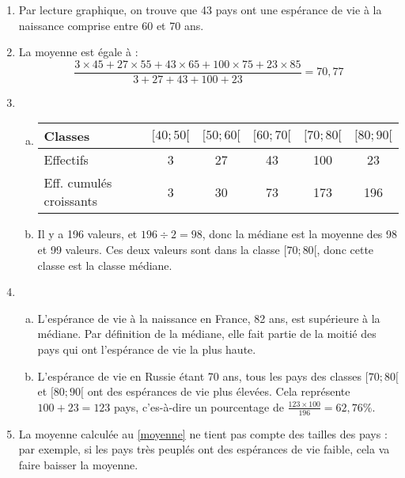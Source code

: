 \documentclass[12pt]{article}
\begin{document}
\begin{exercice}
  \begin{enumerate}[(1)]
    \item Par lecture graphique, on trouve que 43 pays ont une espérance de vie à la naissance comprise entre 60 et 70 ans.
    \item\label{moyenne} La moyenne est égale à :
      \[\frac{3\times45+27\times55+43\times65+100\times75+23\times85}{3+27+43+100+23}=70,77\]
    \item
      \begin{enumerate}[(a)]
        \item 
          \begin{tabular}{l|ccccc}
            Classes & $[40;50[$ & $[50;60[$ & $[60;70[$ & $[70;80[$ & $[80;90[$ \\
            \hline
            Effectifs & 3 & 27 & 43 & 100 & 23 \\
            \hline
            Eff. cumulés croissants & 3 & 30 & 73 & 173 & 196 \\
          \end{tabular}
        \item Il y a 196 valeurs, et $196\div2=98$, donc la médiane est la
          moyenne des 98 et 99 valeurs. Ces deux valeurs sont dans la
          classe $[70;80[$, donc cette classe est la classe médiane.
      \end{enumerate}
    \item
      \begin{enumerate}[(a)]
      \item L'espérance de vie à la naissance en France, 82 ans, est supérieure à la médiane. Par définition de la médiane, elle fait partie de la moitié des pays qui ont l'espérance de vie la plus haute.
      \item L'espérance de vie en Russie étant 70 ans, tous les pays des classes $[70;80[$ et $[80;90[$ ont des espérances de vie plus élevées. Cela représente $100+23=123$ pays, c'es-à-dire un pourcentage de $\frac{123\times100}{196}=62,76\%$.
    \end{enumerate}
  \item La moyenne calculée au \ref{moyenne} ne tient pas compte des tailles
    des pays : par exemple, si les pays très peuplés ont des espérances de vie
    faible, cela va faire baisser la moyenne.
  \end{enumerate}

\end{exercice}
\end{document}
